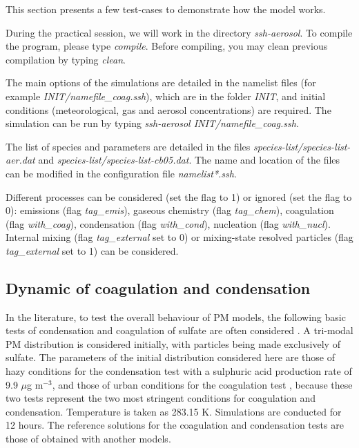 \documentclass[a4paper,11pt]{article}
\begin{document}
This section presents a few test-cases to demonstrate how the model works.

During the practical session, we will work in the directory
{\textit{ssh-aerosol}}. 
To compile the program, please type {\it{compile}}. Before compiling, you may
clean previous compilation by typing {\it{clean}}.

The main options of the simulations are detailed in the namelist files (for
example {\it{INIT/namefile\_coag.ssh}}), which are in the folder {\it{INIT}}, and
initial conditions (meteorological, gas and aerosol concentrations) are
required.
The simulation can be run by typing {\it{ssh-aerosol INIT/namefile\_coag.ssh}}.

The list of species and parameters are detailed in the files {\it{species-list/species-list-aer.dat}} and {\it{species-list/species-list-cb05.dat}}. The name and location of the files can be modified in the configuration file {\it{namelist*.ssh}}.

Different processes can be considered (set the flag to 1) or ignored (set the flag to 0): emissions (flag {\it{tag\_emis}}),
gaseous chemistry (flag {\it{tag\_chem}}),
coagulation (flag {\it{with\_coag}}),
condensation (flag {\it{with\_cond}}),
nucleation (flag {\it{with\_nucl}}).
Internal mixing (flag {\it{tag\_external}} set to 0) or mixing-state resolved particles (flag {\it{tag\_external}} set to 1) can be considered. 

\subsection{Dynamic of coagulation and condensation}

In the literature, to test the overall behaviour of PM models, the following 
basic tests of
condensation and coagulation of sulfate are often considered \cite{seigneur1986simulation,zhang1999simulation,binkowski2003models}. A tri-modal PM distribution is considered initially,
with particles being made exclusively of sulfate. The parameters of the initial distribution
considered here are those of hazy conditions for the condensation test with a sulphuric
acid production rate of 9.9 $\mu$g m$^{-3}$, and those of urban conditions for the coagulation test \cite{seigneur1986simulation,zhang1999simulation} , because these two tests represent the two most
stringent conditions for coagulation and condensation. Temperature is taken as 283.15 K.
Simulations are conducted for 12 hours.
The reference solutions for the coagulation and condensation tests are those of \cite{zhang1999simulation} obtained with another models.
\end{document}

